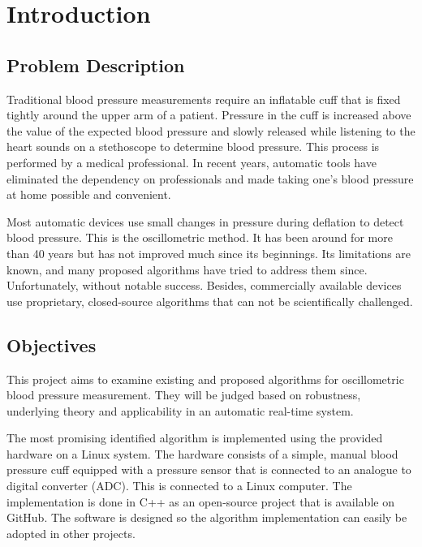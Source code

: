 \chapter{Introduction}\label{cp:Intro}
\section{Problem Description}
Traditional blood pressure measurements require an inflatable cuff that is fixed tightly around the upper arm of a patient. Pressure in the cuff is increased above the value of the expected blood pressure and slowly released while listening to the heart sounds on a stethoscope to determine blood pressure. This process is performed by a medical professional. In recent years, automatic tools have eliminated the dependency on professionals and made taking one's blood pressure at home possible and convenient. 

Most automatic devices use small changes in pressure during deflation to detect blood pressure. This is the oscillometric method. It has been around for more than 40 years but has not improved much since its beginnings. Its limitations are known, and many proposed algorithms have tried to address them since. Unfortunately, without notable success. Besides, commercially available devices use proprietary, closed-source algorithms that can not be scientifically challenged.


\section{Objectives}

This project aims to examine existing and proposed algorithms for oscillometric blood pressure measurement. They will be judged based on robustness, underlying theory and applicability in an automatic real-time system.

The most promising identified algorithm is implemented using the provided hardware on a Linux system. The hardware consists of a simple, manual blood pressure cuff equipped with a pressure sensor that is connected to an analogue to digital converter (ADC). This is connected to a Linux computer. The implementation is done in C++ as an open-source project that is available on GitHub. The software is designed so the algorithm implementation can easily be adopted in other projects.

